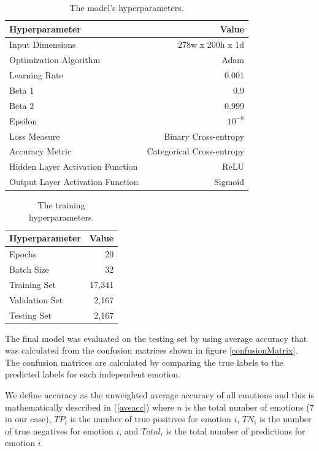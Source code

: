 \documentclass[a4paper, 10pt, conference]{ieeeconf}      %
\begin{document}
\begin{table}
	\centering
	\caption{The model's hyperparameters.}
	\label{modelHyperparams}
	\begin{tabular}{@{}lr@{}}
		\toprule
		Hyperparameter & Value \\
		\midrule
		Input Dimensions & 278w x 200h x 1d \\
		Optimization Algorithm & Adam \\
		Learning Rate & 0.001 \\
		Beta 1 & 0.9 \\
		Beta 2 & 0.999 \\
		Epsilon & $10^{-8}$ \\
		Loss Measure & Binary Cross-entropy \\
		Accuracy Metric & Categorical Cross-entropy \\
		Hidden Layer Activation Function & ReLU \\
		Output Layer Activation Function & Sigmoid \\
		\bottomrule
	\end{tabular}
\end{table}

\begin{table}
	\centering
	\caption{The training hyperparameters.}
	\label{trainHyperparams}
	\begin{tabular}{@{}lr@{}}
		\toprule
		Hyperparameter & Value \\
		\midrule
		Epochs & 20 \\
		Batch Size & 32 \\
		Training Set & 17,341 \\
		Validation Set & 2,167 \\
		Testing Set & 2,167 \\
		\bottomrule
	\end{tabular}
\end{table}

The final model was evaluated on the testing set by using average accuracy that was calculated from the confusion matrices shown in figure \ref{confusionMatrix}. The confusion matrices are calculated by comparing the true labels to the predicted labels for each independent emotion.

We define accuracy as the unweighted average accuracy of all emotions and this is mathematically described in (\ref{aveacc}) where $n$ is the total number of emotions (7 in our case), $TP_{i}$ is the number of true positives for emotion $i$, $TN_{i}$ is the number of true negatives for emotion $i$, and $Total_{i}$ is the total number of predictions for emotion $i$.
\end{document}
